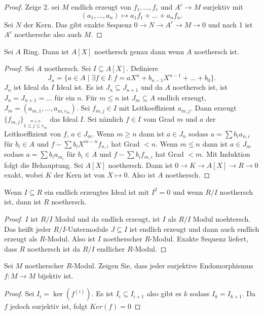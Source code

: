 \begin{proof}
	Zeige 2. sei \(M\) endlich erzeugt von \(f_1,\dots,f_r\) und \(A^r\to M\) surjektiv mit \[(a_1,\dots,a_n)\mapsto a_1f_1+\dots+a_nf_n.\] Sei \(N\) der Kern. Das gibt exakte Sequenz 
	\(0\to N\to A^r\to M\to 0\) und nach 1 ist \(A^r\) noethersche also auch \(M\).
\end{proof}
\begin{Satz} Sei \(A\) Ring.  Dann ist \(A[X]\) noethersch genau dann wenn \(A\) noethersch ist.
\end{Satz}
\begin{proof}
	Sei \(A\) noethersch.
	Sei \(I\subseteq A[X]\). Definiere \[J_n=\{a\in A\mid \exists f\in I\colon f=aX^n+b_{n-1}X^{n-1}+\dots+b_0\}.\] \(J_n\) ist Ideal da \(I\) Ideal ist. Es ist \(J_n\subseteq J_{n+1}\) und da \(A\) noethersch ist, ist \(J_n=J_{n+1}=\dots\) für ein \(n\).
	Für \(m\leq n\) ist \(J_m\subseteq A\) endlich erzeugt, \(J_m=(a_{m,1},\dots,a_{m,r_m})\). Sei \(f_{m,j}\in I\) mit Leitkoeffizient \(a_{m,j}\). Dann erzeugt \(\{f_{m,j}\}_{\stackrel{m\leq n}{1\leq j\leq r_m}}\) das Ideal \(I\). Sei nämlich \(f\in I\) vom Grad \(m\) und \(a\) der Leitkoeffizient von \(f\), \(a\in J_m\).
	Wenn \(m\geq n\) dann ist \(a\in J_n\) sodass \(a=\sum b_ia_{n,i}\) für \(b_i\in A\) und \(f-\sum b_iX^{m-n}f_{n,i}\) hat Grad \(<n\).
	Wenn \(m\leq n\) dann ist \(a\in J_m\) sodass \(a=\sum b_ia_{m_i}\) für \(b_i\in A\) und \(f-\sum b_if_{m,i}\) hat Grad \(<m\). Mit Induktion folgt die Behauptung.
	Sei \(A[X]\) noethersch. Dann ist \(0\to K\to A[X]\to R\to 0\) exakt, wobei \(K\) der Kern ist von \(X\mapsto 0\). Also ist \(A\) noethersch.
\end{proof}
\begin{Lemma}
	Wenn \(I\subseteq R\) ein endlich erzeugtes Ideal ist mit \(I^2=0\) und wenn \(R/I\) noethersch ist, dann ist \(R\) noethersch.
\end{Lemma}
\begin{proof}
	\(I\) ist \(R/I\) Modul und da endlich erzeugt, ist \(I\) als \(R/I\) Modul noehtersch. Das heißt jeder \(R/I\)-Untermodule \(J\subseteq I\) ist endlich erzeugt und dann auch endlich erzeugt als \(R\)-Modul. Also ist \(I\) noetherscher \(R\)-Modul. Exakte Sequenz liefert, dass \(R\) noethersch ist da \(R/I\) endlicher \(R\)-Modul.
\end{proof}
\begin{Lemma}
	Sei \(M\) noetherscher \(R\)-Modul. Zeigen Sie, dass jeder surjektive Endomorphismus \(f\colon M\to M\) bijektiv ist.
\end{Lemma}
\begin{proof}
	Sei \(I_i=\ker(f^{(i)})\). Es ist \(I_i\subseteq I_{i+1}\) also gibt es \(k\) sodass \(I_k=I_{k+1}\). Da \(f\) jedoch surjektiv ist, folgt \(Ker(f)=0\)
\end{proof}



